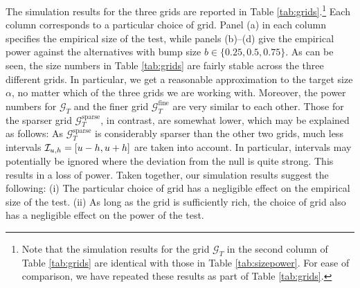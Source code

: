 \documentclass[12pt]{article}
\begin{document}
The simulation results for the three grids are reported in Table \ref{tab:grids}.\footnote{Note that the simulation results for the grid $\mathcal{G}_T$ in the second column of Table \ref{tab:grids} are identical with those in Table \ref{tab:sizepower}. For ease of comparison, we have repeated these results as part of Table \ref{tab:grids}.}
Each column corresponds to a particular choice of grid. Panel (a) in each column specifies the empirical size of the test, while panels (b)--(d) give the empirical power against the alternatives with bump size $b \in \{0.25,0.5,0.75\}$. 
As can be seen, the size numbers in Table \ref{tab:grids} are fairly stable across the three different grids. In particular, we get a reasonable approximation to the target size $\alpha$, no matter which of the three grids we are working with. Moreover, the power numbers for $\mathcal{G}_T$ and the finer grid $\mathcal{G}_T^{\text{fine}}$ are very similar to each other. Those for the sparser grid $\mathcal{G}_T^{\text{sparse}}$, in contrast, are somewhat lower, which may be explained as follows: As $\mathcal{G}_T^{\text{sparse}}$ is considerably sparser than the other two grids, much less intervals $\mathcal{I}_{u, h} = [u-h,u+h]$ are taken into account. In particular, intervals may potentially be ignored where the deviation from the null is quite strong. This results in a loss of power.
Taken together, our simulation results suggest the following: (i) The particular choice of grid has a negligible effect on the empirical size of the test. (ii) As long as the grid is sufficiently rich, the choice of grid also has a negligible effect on the power of the test. 
\end{document}
